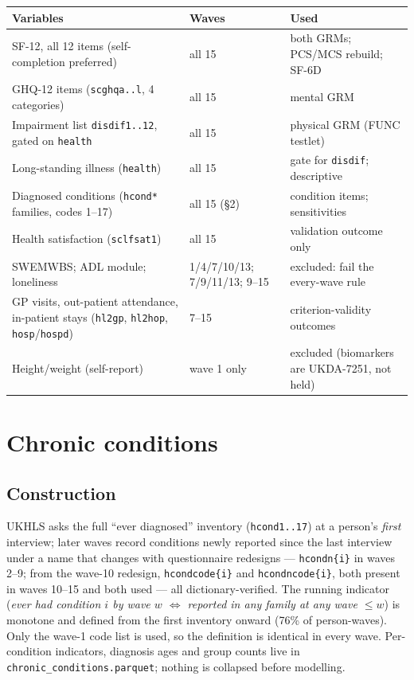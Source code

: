 \documentclass[11pt]{article}
\newcommand{\code}[1]{\texttt{\small #1}}
\begin{document}
\begin{center}\small
\begin{tabular}{p{7.6cm}p{2.4cm}p{4.6cm}}
\toprule
Variables & Waves & Used \\
\midrule
SF-12, all 12 items (self-completion preferred) & all 15 & both GRMs; PCS/MCS rebuild; SF-6D \\
GHQ-12 items (\code{scghqa..l}, 4 categories) & all 15 & mental GRM \\
Impairment list \code{disdif1..12}, gated on \code{health} & all 15 & physical GRM (FUNC testlet) \\
Long-standing illness (\code{health}) & all 15 & gate for \code{disdif}; descriptive \\
Diagnosed conditions (\code{hcond*} families, codes 1--17) & all 15 (\S2) & condition items; sensitivities \\
Health satisfaction (\code{sclfsat1}) & all 15 & validation outcome only \\
SWEMWBS; ADL module; loneliness & 1/4/7/10/13; 7/9/11/13; 9--15 & excluded: fail the every-wave rule \\
GP visits, out-patient attendance, in-patient stays (\code{hl2gp}, \code{hl2hop}, \code{hosp}/\code{hospd}) & 7--15 & criterion-validity outcomes \\
Height/weight (self-report) & wave 1 only & excluded (biomarkers are UKDA-7251, not held) \\
\bottomrule
\end{tabular}
\end{center}

\section{Chronic conditions}
\label{sec:chronic}

\subsection{Construction}
UKHLS asks the full ``ever diagnosed'' inventory (\code{hcond1..17}) at a
person's \emph{first} interview; later waves record conditions newly reported
since the last interview under a name that changes with questionnaire
redesigns --- \code{hcondn\{i\}} in waves 2--9; from the wave-10 redesign,
\code{hcondcode\{i\}} and \code{hcondncode\{i\}}, both present in waves
10--15 and both used --- all dictionary-verified. The
running indicator (\emph{ever had condition $i$ by wave $w$ $\Leftrightarrow$
reported in any family at any wave $\le w$}) is monotone and defined from the
first inventory onward (76\% of person-waves). Only the wave-1 code list is
used, so the definition is identical in every wave. Per-condition indicators,
diagnosis ages and group counts live in
\code{chronic\_conditions.parquet}; nothing is collapsed before modelling.
\end{document}
